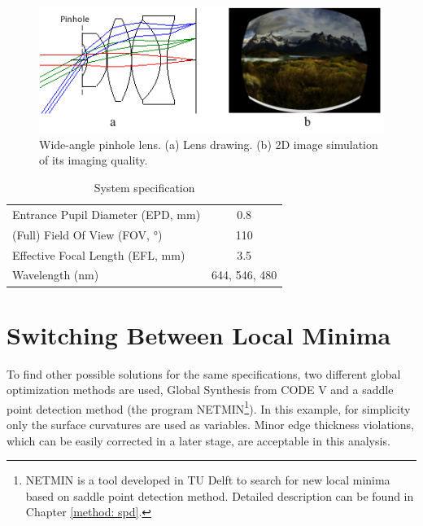 \begin{figure}[h!]
    \centering
    \includegraphics[scale=0.95]{chapter-3/figures/WidePinLens.png}
    \caption{Wide-angle pinhole lens. (a) Lens drawing. (b) 2D image simulation of its imaging quality.}
    \label{fig:widepinLens}
\end{figure}

\setlength{\arrayrulewidth}{.5mm}
\setlength{\tabcolsep}{18pt}
\renewcommand{\arraystretch}{1.2}
\begin{table}[h!]
    \centering
    \captionsetup{justification=centering}
    \caption{System specification}
    \label{table: sysspec}
    \vspace{-1em}
    \begin{tabular}{ p{20em} c }
    \hline 
    Entrance Pupil Diameter (EPD, mm) & 0.8\\
    (Full) Field Of View (FOV, °) & 110\\
    Effective Focal Length (EFL, mm) & 3.5\\
    Wavelength (nm) & 644, 546, 480\\
    \hline
    \end{tabular}
\end{table}



\section{Switching Between Local Minima}

To find other possible solutions for the same specifications, two different global optimization methods are used, Global Synthesis from CODE V \cite{KuperGO1992}\cite{RogersGO2006} and a saddle point detection method (the program NETMIN\footnote{NETMIN is a tool developed in TU Delft to search for new local minima based on saddle point detection method. Detailed description can be found in Chapter \ref{method: spd}.}). In this example, for simplicity only the surface curvatures are used as variables. Minor edge thickness violations, which can be easily corrected in a later stage, are acceptable in this analysis. 

